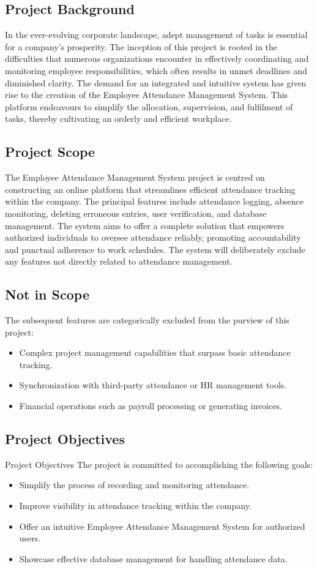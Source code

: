 \documentclass[a4paper, 12pt]{article}
\begin{document}
\subsection{Project Background}
In the ever-evolving corporate landscape, adept management of tasks is essential for a company’s prosperity. The inception of this project is rooted in the difficulties that numerous organizations encounter in effectively coordinating and monitoring employee responsibilities, which often results in unmet deadlines and diminished clarity. The demand for an integrated and intuitive system has given rise to the creation of the Employee Attendance Management System. This platform endeavours to simplify the allocation, supervision, and fulfilment of tasks, thereby cultivating an orderly and efficient workplace.

\subsection{Project Scope}
The Employee Attendance Management System project is centred on constructing an online platform that streamlines efficient attendance tracking within the company. The principal features include attendance logging, absence monitoring, deleting erroneous entries, user verification, and database management. The system aims to offer a complete solution that empowers authorized individuals to oversee attendance reliably, promoting accountability and punctual adherence to work schedules. The system will deliberately exclude any features not directly related to attendance management.

\subsection{Not in Scope}
The subsequent features are categorically excluded from the purview of this project:
\begin{itemize}
    \item Complex project management capabilities that surpass basic attendance tracking.
    \item Synchronization with third-party attendance or HR management tools.
    \item Financial operations such as payroll processing or generating invoices.
\end{itemize}

\subsection{Project Objectives}
Project Objectives The project is committed to accomplishing the following goals:
\begin{itemize}
    \item Simplify the process of recording and monitoring attendance.
    \item Improve visibility in attendance tracking within the company.
    \item Offer an intuitive Employee Attendance Management System for authorized users.
    \item Showcase effective database management for handling attendance data.
\end{itemize}
\end{document}
